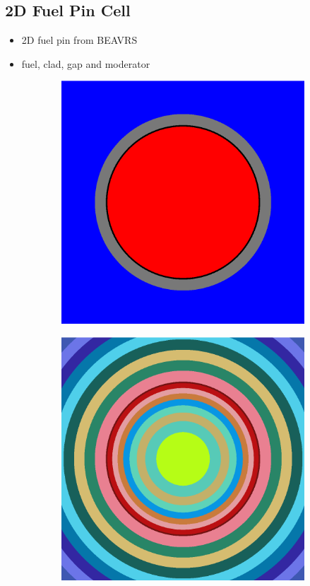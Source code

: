 \subsection{2D Fuel Pin Cell}
\label{subsec:chap4-pin}

\begin{itemize}[noitemsep]
  \item 2D fuel pin from \ac{BEAVRS}
  \item fuel, clad, gap and moderator
\end{itemize}

\begin{figure}[h!]
\begin{subfigure}{.33\textwidth}
  \centering
  \includegraphics[width=0.9\linewidth]{figures/biases/pin-cell/pin-cell-simple}
  \caption{}
\end{subfigure}%
\begin{subfigure}{.33\textwidth}
  \centering
  \includegraphics[width=0.9\linewidth]{figures/biases/pin-cell/pin-cell-8x}

\end{subfigure}
\end{figure}
